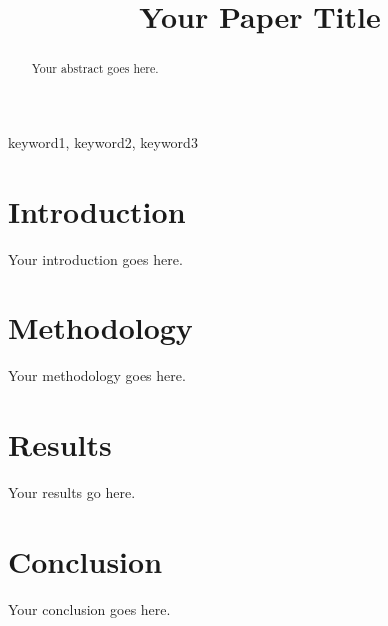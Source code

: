 \documentclass[conference]{IEEEtran}
\begin{document}
\title{Your Paper Title}
\author{
}

\maketitle

\begin{abstract}
Your abstract goes here.
\end{abstract}

\begin{IEEEkeywords}
keyword1, keyword2, keyword3
\end{IEEEkeywords}

\section{Introduction}
Your introduction goes here.

\section{Methodology}
Your methodology goes here.

\section{Results}
Your results go here.

\section{Conclusion}
Your conclusion goes here.



\end{document}
